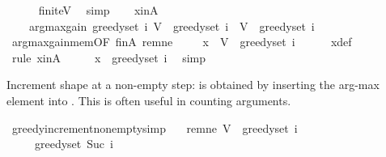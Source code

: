 \begin{isabellebody}
\ \ \ \ \isamarkupfalse%
\ finite{\isacharunderscore}{\kern0pt}V\ \isamarkupfalse%
\ simp\isanewline
\ \ \isamarkupfalse%
\ xinA{\isacharcolon}{\kern0pt}\isanewline
\ \ \ \ {\isachardoublequoteopen}argmax{\isacharunderscore}{\kern0pt}gain\ {\isacharparenleft}{\kern0pt}greedy{\isacharunderscore}{\kern0pt}set\ i{\isacharparenright}{\kern0pt}\ {\isacharparenleft}{\kern0pt}V\ {\isacharminus}{\kern0pt}\ greedy{\isacharunderscore}{\kern0pt}set\ i{\isacharparenright}{\kern0pt}\ {\isasymin}\ V\ {\isacharminus}{\kern0pt}\ greedy{\isacharunderscore}{\kern0pt}set\ i{\isachardoublequoteclose}\isanewline
\ \ \ \ \isamarkupfalse%
\ argmax{\isacharunderscore}{\kern0pt}gain{\isacharunderscore}{\kern0pt}mem{\isacharbrackleft}{\kern0pt}OF\ finA\ rem{\isacharunderscore}{\kern0pt}ne{\isacharbrackright}{\kern0pt}\ \isakeywordONE{{\isachardot}{\kern0pt}}\isamarkupfalse%
\isanewline
\ \ \isamarkupfalse%
\ {\isachardoublequoteopen}x\ {\isasymin}\ V\ {\isacharminus}{\kern0pt}\ greedy{\isacharunderscore}{\kern0pt}set\ i{\isachardoublequoteclose}\isanewline
\ \ \ \ \isamarkupfalse%
\ x{\isacharunderscore}{\kern0pt}def\ \isamarkupfalse%
\ {\isacharparenleft}{\kern0pt}rule\ xinA{\isacharparenright}{\kern0pt}\isanewline
\ \ \isamarkupfalse%
\ \isamarkupfalse%
\ {\isachardoublequoteopen}x\ {\isasymnotin}\ greedy{\isacharunderscore}{\kern0pt}set\ i{\isachardoublequoteclose}\ \isamarkupfalse%
\ simp\isanewline
{}\isamarkupfalse%
%
\endisatagproof
{\isafoldproof}%
%
\isadelimproof
%
\endisadelimproof
%
\begin{isamarkuptext}%
Increment shape at a non-empty step:  is obtained by inserting
  the arg-max element into . This is often useful in counting arguments.%
\end{isamarkuptext}\isamarkuptrue%
\isamarkupfalse%
\ greedy{\isacharunderscore}{\kern0pt}increment{\isacharunderscore}{\kern0pt}nonempty{\isacharbrackleft}{\kern0pt}simp{\isacharbrackright}{\kern0pt}{\isacharcolon}{\kern0pt}\isanewline
\ \ \ rem{\isacharunderscore}{\kern0pt}ne{\isacharcolon}{\kern0pt}\ {\isachardoublequoteopen}V\ {\isacharminus}{\kern0pt}\ greedy{\isacharunderscore}{\kern0pt}set\ i\ {\isasymnoteq}\ {\isacharbraceleft}{\kern0pt}{\isacharbraceright}{\kern0pt}{\isachardoublequoteclose}\isanewline
\ \ \ \ \ {\isachardoublequoteopen}greedy{\isacharunderscore}{\kern0pt}set\ {\isacharparenleft}{\kern0pt}Suc\ i{\isacharparenright}{\kern0pt}\ {\isacharequal}{\kern0pt}\isanewline

\end{isabellebody}
